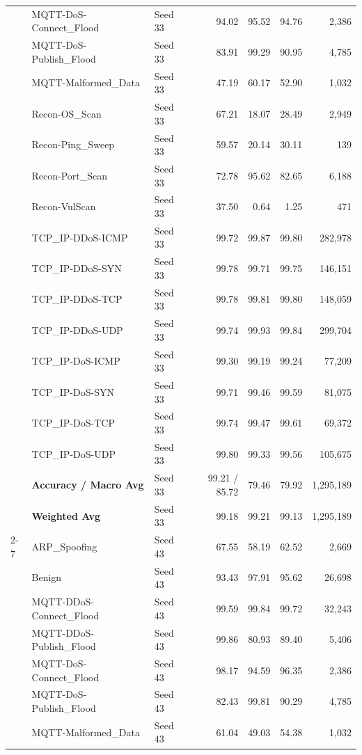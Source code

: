 \documentclass[a4paper,fleqn]{cas-sc}
\begin{document}
{\begin{landscape}
\begin{longtable}{lllrrrr}
 & MQTT-DoS-Connect\_Flood & Seed 33 & 94.02 & 95.52 & 94.76 & 2,386 \\
 & MQTT-DoS-Publish\_Flood & Seed 33 & 83.91 & 99.29 & 90.95 & 4,785 \\
 & MQTT-Malformed\_Data & Seed 33 & 47.19 & 60.17 & 52.90 & 1,032 \\
 & Recon-OS\_Scan & Seed 33 & 67.21 & 18.07 & 28.49 & 2,949 \\
 & Recon-Ping\_Sweep & Seed 33 & 59.57 & 20.14 & 30.11 & 139 \\
 & Recon-Port\_Scan & Seed 33 & 72.78 & 95.62 & 82.65 & 6,188 \\
 & Recon-VulScan & Seed 33 & 37.50 & 0.64 & 1.25 & 471 \\
 & TCP\_IP-DDoS-ICMP & Seed 33 & 99.72 & 99.87 & 99.80 & 282,978 \\
 & TCP\_IP-DDoS-SYN & Seed 33 & 99.78 & 99.71 & 99.75 & 146,151 \\
 & TCP\_IP-DDoS-TCP & Seed 33 & 99.78 & 99.81 & 99.80 & 148,059 \\
 & TCP\_IP-DDoS-UDP & Seed 33 & 99.74 & 99.93 & 99.84 & 299,704 \\
 & TCP\_IP-DoS-ICMP & Seed 33 & 99.30 & 99.19 & 99.24 & 77,209 \\
 & TCP\_IP-DoS-SYN & Seed 33 & 99.71 & 99.46 & 99.59 & 81,075 \\
 & TCP\_IP-DoS-TCP & Seed 33 & 99.74 & 99.47 & 99.61 & 69,372 \\
 & TCP\_IP-DoS-UDP & Seed 33 & 99.80 & 99.33 & 99.56 & 105,675 \\
 & \textbf{Accuracy / Macro Avg} & Seed 33 & 99.21 / 85.72 & 79.46 & 79.92 & 1,295,189 \\
 & \textbf{Weighted Avg} & Seed 33 & 99.18 & 99.21 & 99.13 & 1,295,189 \\
\cline{2-7}
 & ARP\_Spoofing & Seed 43 & 67.55 & 58.19 & 62.52 & 2,669 \\
 & Benign & Seed 43 & 93.43 & 97.91 & 95.62 & 26,698 \\
 & MQTT-DDoS-Connect\_Flood & Seed 43 & 99.59 & 99.84 & 99.72 & 32,243 \\
 & MQTT-DDoS-Publish\_Flood & Seed 43 & 99.86 & 80.93 & 89.40 & 5,406 \\
 & MQTT-DoS-Connect\_Flood & Seed 43 & 98.17 & 94.59 & 96.35 & 2,386 \\
 & MQTT-DoS-Publish\_Flood & Seed 43 & 82.43 & 99.81 & 90.29 & 4,785 \\
 & MQTT-Malformed\_Data & Seed 43 & 61.04 & 49.03 & 54.38 & 1,032 \\

\end{longtable}
\end{landscape}}
\end{document}
